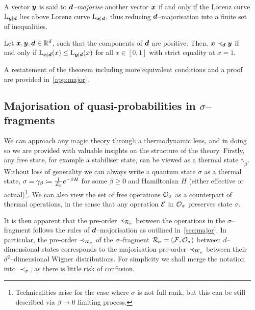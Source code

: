\documentclass[pra,
aps,
twocolumn,
superscriptaddress,
groupedaddress,
nofootinbib,
reprint
]{revtex4-1}
\begin{document}
A vector $\bm{y}$ is said to \emph{$\bm{d}$--majorise} another vector $\bm{x}$ if and only if the Lorenz curve ${{\rm{L}}_{\bm{y}|\bm{d}}}$ lies above Lorenz curve ${{\rm{L}}_{\bm{x}|\bm{d}}}$, thus reducing $\bm{d}$--majorisation into a finite set of inequalities.
\begin{theorem}\label{thm:dmajor}
    Let $\bm{x}, \bm{y}, \bm{d} \in \mathbb{R}^d$, such that the components of $\bm{d}$ are positive. 
    Then, $\bm{x} \prec_{\bm{d}} \bm{y}$ if and only if ${{\rm{L}}_{\bm{x}|\bm{d}}}(x) \leq {{\rm{L}}_{\bm{y}|\bm{d}}}(x)$ for all $x \in [0,1]$ with strict equality at $x=1$.
\end{theorem}
A restatement of the theorem including more equivalent conditions and a proof are provided in~\cref{app:major}.
	


\subsection{Majorisation of quasi-probabilities in $\sigma$--fragments}\label{sec:major_frag}

We can approach any magic theory through a thermodynamic lens, and in doing so we are provided with valuable insights on the structure of the theory. 
Firstly, any free state, for example a stabiliser state, can be viewed as a thermal state $\gamma_\beta$.
Without loss of generality we can always write a quantum state $\sigma$ as a thermal state, $\sigma = \gamma_\beta \coloneqq \frac{1}{\mathcal{Z}_\beta} e^{-\beta H}$ for some $\beta \geq 0$ and Hamiltonian $H$ (either effective or actual)\footnote{Technicalities arise for the case where $\sigma$ is not full rank, but this can be still described via $ \beta \rightarrow 0$ limiting process.}.
We can also view the set of free operations $\mathcal{O}_\sigma$ as a counterpart of thermal operations, in the sense that any operation $\mathcal{E}$ in $\mathcal{O}_\sigma$ preserves state $\sigma$. 

It is then apparent that the pre-order $\prec_{\mathcal{R}_\sigma}$ between the operations in the $\sigma$--fragment follows the rules of $\bm{d}$--majorisation as outlined in~\cref{sec:major}.
In particular, the pre-order $\prec_{\mathcal{R}_\sigma}$ of the $\sigma$--fragment $\mathcal{R}_\sigma = (\mathcal{F}, \mathcal{O}_\sigma)$ between $d$--dimensional states corresponds to the majorisation pre-order $\prec_{\W{\sigma}}$ between their $d^2$--dimensional Wigner distributions.
For simplicity we shall merge the notation into $\prec_\sigma$, as there is little risk of confusion.
\end{document}
